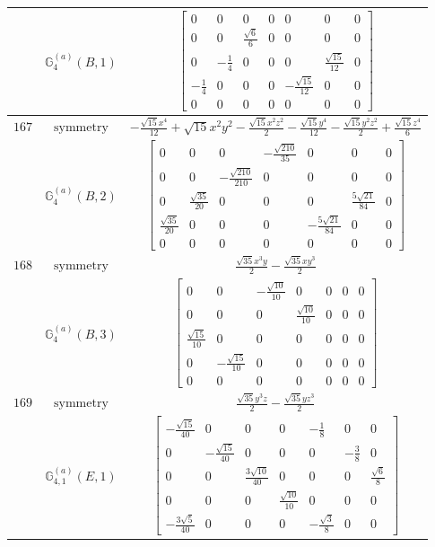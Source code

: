 \documentclass[fleqn,8pt,landscape]{jsarticle}
\begin{document}
\begin{longtable}{ccc}
$  $ & $ \mathbb{G}_{4}^{(a)}(B,1) $ & $ \begin{bmatrix} 0 & 0 & 0 & 0 & 0 & 0 & 0 \\ 0 & 0 & \frac{\sqrt{6}}{6} & 0 & 0 & 0 & 0 \\ 0 & - \frac{1}{4} & 0 & 0 & 0 & \frac{\sqrt{15}}{12} & 0 \\ - \frac{1}{4} & 0 & 0 & 0 & - \frac{\sqrt{15}}{12} & 0 & 0 \\ 0 & 0 & 0 & 0 & 0 & 0 & 0 \end{bmatrix} $ \\ \hline
$ 167 $ & $ \text{symmetry} $ & $ - \frac{\sqrt{15} x^{4}}{12} + \sqrt{15} x^{2} y^{2} - \frac{\sqrt{15} x^{2} z^{2}}{2} - \frac{\sqrt{15} y^{4}}{12} - \frac{\sqrt{15} y^{2} z^{2}}{2} + \frac{\sqrt{15} z^{4}}{6} $ \\
$  $ & $ \mathbb{G}_{4}^{(a)}(B,2) $ & $ \begin{bmatrix} 0 & 0 & 0 & - \frac{\sqrt{210}}{35} & 0 & 0 & 0 \\ 0 & 0 & - \frac{\sqrt{210}}{210} & 0 & 0 & 0 & 0 \\ 0 & \frac{\sqrt{35}}{20} & 0 & 0 & 0 & \frac{5 \sqrt{21}}{84} & 0 \\ \frac{\sqrt{35}}{20} & 0 & 0 & 0 & - \frac{5 \sqrt{21}}{84} & 0 & 0 \\ 0 & 0 & 0 & 0 & 0 & 0 & 0 \end{bmatrix} $ \\ \hline
$ 168 $ & $ \text{symmetry} $ & $ \frac{\sqrt{35} x^{3} y}{2} - \frac{\sqrt{35} x y^{3}}{2} $ \\
$  $ & $ \mathbb{G}_{4}^{(a)}(B,3) $ & $ \begin{bmatrix} 0 & 0 & - \frac{\sqrt{10}}{10} & 0 & 0 & 0 & 0 \\ 0 & 0 & 0 & \frac{\sqrt{10}}{10} & 0 & 0 & 0 \\ \frac{\sqrt{15}}{10} & 0 & 0 & 0 & 0 & 0 & 0 \\ 0 & - \frac{\sqrt{15}}{10} & 0 & 0 & 0 & 0 & 0 \\ 0 & 0 & 0 & 0 & 0 & 0 & 0 \end{bmatrix} $ \\ \hline
$ 169 $ & $ \text{symmetry} $ & $ \frac{\sqrt{35} y^{3} z}{2} - \frac{\sqrt{35} y z^{3}}{2} $ \\
$  $ & $ \mathbb{G}_{4,1}^{(a)}(E,1) $ & $ \begin{bmatrix} - \frac{\sqrt{15}}{40} & 0 & 0 & 0 & - \frac{1}{8} & 0 & 0 \\ 0 & - \frac{\sqrt{15}}{40} & 0 & 0 & 0 & - \frac{3}{8} & 0 \\ 0 & 0 & \frac{3 \sqrt{10}}{40} & 0 & 0 & 0 & \frac{\sqrt{6}}{8} \\ 0 & 0 & 0 & \frac{\sqrt{10}}{10} & 0 & 0 & 0 \\ - \frac{3 \sqrt{5}}{40} & 0 & 0 & 0 & - \frac{\sqrt{3}}{8} & 0 & 0 \end{bmatrix} $ \\ \hline

\end{longtable}
\end{document}
